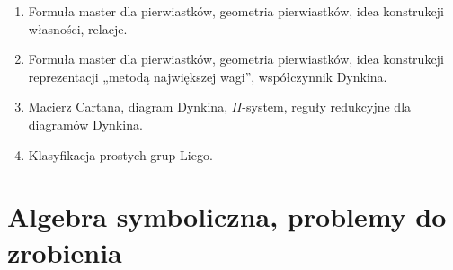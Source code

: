 \documentclass[a4paper,11pt]{article}
\begin{document}
\begin{enumerate}
\item Formuła master dla pierwiastków, geometria pierwiastków, idea
  konstrukcji własności, relacje.

\item Formuła master dla pierwiastków, geometria pierwiastków, idea
  konstrukcji reprezentacji „metodą największej wagi”, współczynnik Dynkina.

\item Macierz Cartana, diagram Dynkina, $\Pi$-system, reguły redukcyjne dla
  diagramów Dynkina.

\item Klasyfikacja prostych grup Liego.





\end{enumerate}






\section{Algebra symboliczna, problemy do zrobienia}


\end{document}
